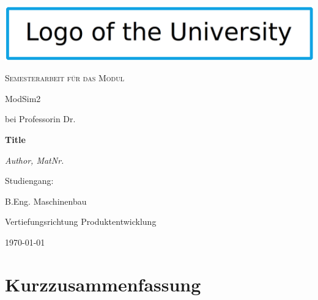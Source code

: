 \documentclass[a4paper, 11pt]{scrreprt}
\begin{document}
\begin{titlepage} %
\centering
	\includegraphics[width=\textwidth]{graphics/university-logo}\par\vspace{1.5cm}
	\vspace{1.5cm}
	{\scshape\Large Semesterarbeit für das Modul\par
    ModSim2\par
    bei Professorin Dr.\par}
	\vspace{2cm}
	{\huge\bfseries Title\par}
	\vspace{2cm}
	{\Large\itshape Author, MatNr.\par}
	\vfill
	Studiengang:\par
	B.Eng. Maschinenbau\par
    Vertiefungsrichtung Produktentwicklung

	\vfill

	{\large \today\par}
\end{titlepage}

\chapter*{Kurzzusammenfassung}  %

\newpage
{}
\end{document}
